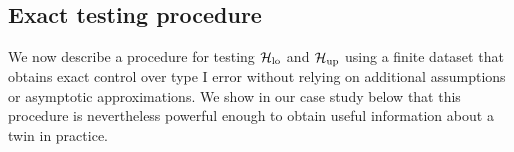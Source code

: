 




\subsection{Exact testing procedure} \label{sec:statistical-methodology}

We now describe a procedure for testing $\mathcal{H}_{\mathrm{lo}}$ and $\mathcal{H}_{\mathrm{up}}$ using a finite dataset that obtains exact control over type I error without relying on additional assumptions or asymptotic approximations.
We show in our case study below that this procedure is nevertheless powerful enough to obtain useful information about a twin in practice.



